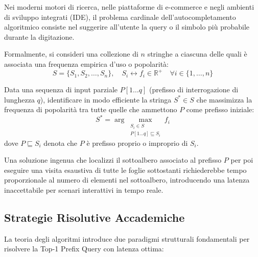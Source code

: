 Nei moderni motori di ricerca, nelle piattaforme di e-commerce e negli ambienti di sviluppo integrati (IDE), il problema cardinale dell'autocompletamento algoritmico consiste nel suggerire all'utente la query o il simbolo pi\`u probabile durante la digitazione.

Formalmente, si consideri una collezione di $n$ stringhe a ciascuna delle quali \`e associata una frequenza empirica d'uso o popolarit\`a:
\begin{equation}
  S = \{ S_1, S_2, \dots, S_n \}, \quad S_i \longleftrightarrow f_i \in \mathbb{R}^+ \quad \forall i \in \{1, \dots, n\}
\end{equation}

\begin{definition}
Data una sequenza di input parziale $P[1 \dots q]$ (prefisso di interrogazione di lunghezza $q$), identificare in modo efficiente la stringa $S^* \in S$ che massimizza la frequenza di popolarit\`a tra tutte quelle che ammettono $P$ come prefisso iniziale:
\begin{equation}
  S^* = \arg\max_{\substack{S_i \in S \\ P[1 \dots q] \sqsubseteq S_i}} f_i
\end{equation}
dove $P \sqsubseteq S_i$ denota che $P$ \`e prefisso proprio o improprio di $S_i$.
\end{definition}

Una soluzione ingenua che localizzi il sottoalbero associato al prefisso $P$ per poi eseguire una visita esaustiva di tutte le foglie sottostanti richiederebbe tempo proporzionale al numero di elementi nel sottoalbero, introducendo una latenza inaccettabile per scenari interattivi in tempo reale.

\FloatBarrier
\subsection{Strategie Risolutive Accademiche}
\label{subsec:strategie-autocompletamento}

La teoria degli algoritmi introduce due paradigmi strutturali fondamentali per risolvere la Top-1 Prefix Query con latenza ottima:

